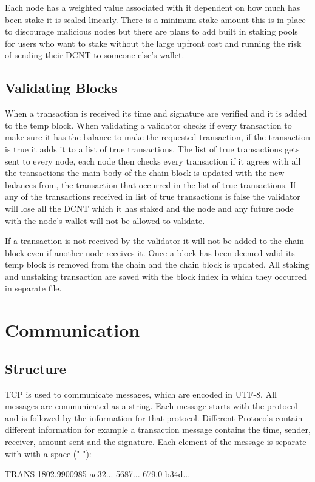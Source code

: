\documentclass[11pt]{article}
\begin{document}
Each node has a weighted value associated with it dependent on how much has been stake it is scaled linearly. There is a minimum stake amount this is in place to discourage malicious nodes but there are plans to add built in staking pools for users who want to stake without the large upfront cost and running the risk of sending their DCNT to someone else's wallet.
\subsection{Validating Blocks}
When a transaction is received its time and signature are verified and it is added to the temp block. When validating a validator checks if every transaction to make sure it has the balance to make the requested transaction, if the transaction is true it adds it to a list of true transactions. The list of true transactions gets sent to every node, each node then checks every transaction if it agrees with all the transactions the main body of the chain block is updated with the new balances from, the transaction that occurred in the list of true transactions. If any of the transactions received in list of true transactions is false the validator will lose all the DCNT which it has staked and the node and any future node with the node's wallet will not be allowed to validate.

If a transaction is not received by the validator it will not be added to the chain block even if another node receives it. Once a block has been deemed valid its temp block is removed from the chain and the chain block is updated. All staking and unstaking transaction are saved with the block index in which they occurred in separate file.

\section{Communication}
\subsection{Structure}
TCP is used to communicate messages, which are encoded in UTF-8. All messages are communicated as a string. Each message starts with the protocol and is followed by the information for that protocol. Different Protocols contain different information for example a transaction message contains the time, sender, receiver, amount sent and the signature. Each element of the message is separate with with a space (" "):

\begin{center}
TRANS\hspace{0.1cm} 1802.9900985 \hspace{0.1cm} ae32... \hspace{0.1cm} 5687... \hspace{0.1cm}  679.0 \hspace{0.1cm} b34d...
\end{center}
\end{document}
